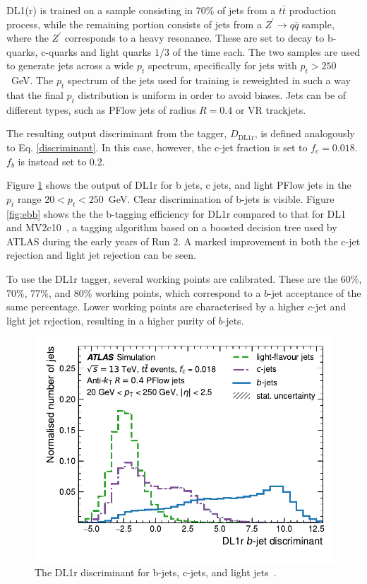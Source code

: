 \documentclass[10pt,a4paper]{book}
\begin{document}
DL1(r) is trained on a sample consisting in 70\% of jets from a $t\bar{t}$ production process, while the remaining portion consists of jets from a $Z^\prime \rightarrow q\bar{q}$ sample, where the $Z^\prime$ corresponds to a heavy resonance. These are set to decay to b-quarks, c-quarks and light quarks $1/3$ of the time each. The two samples are used to generate jets across a wide $p_t$ spectrum, specifically for jets with $p_t > 250$~GeV. The $p_t$ spectrum of the jets used for training is reweighted in such a way that the final $p_t$ distribution is uniform in order to avoid biases. Jets can be of different types, such as PFlow jets of radius $R = 0.4$ or VR trackjets.

The resulting output discriminant from the tagger, $D_{\text{DL1r}}$, is defined analogously to Eq. \ref{discriminant}. In this case, however, the c-jet fraction is set to $f_c = 0.018$. $f_b$ is instead set to 0.2. 

Figure \ref{fig:dl1r discriminant} shows the output of DL1r for b jets, c jets, and light PFlow jets in the $p_t$ range $20 < p_t < 250$~GeV. Clear discrimination of b-jets is visible. Figure \ref{fig:ebb} shows the the b-tagging efficiency for DL1r compared to that for DL1 and MV2c10~\cite{ATLAS:2019bwq}, a tagging algorithm based on a boosted decision tree used by ATLAS during the early years of Run 2. A marked improvement in both the c-jet rejection and light jet rejection can be seen.

To use the DL1r tagger, several working points are calibrated. These are the 60\%, 70\%, 77\%, and 80\% working points, which correspond to a $b$-jet acceptance of the same percentage. Lower working points are characterised by a higher $c$-jet and light jet rejection, resulting in a higher purity of $b$-jets.

\begin{figure}
    \centering
    \includegraphics[width=0.8\linewidth]{atlas/ftag/dl1r_discriminant.pdf}
    \caption{The DL1r discriminant for b-jets, c-jets, and light jets~\cite{ATLAS:2022qxm}.}
    \label{fig:dl1r discriminant}
\end{figure}
\end{document}
